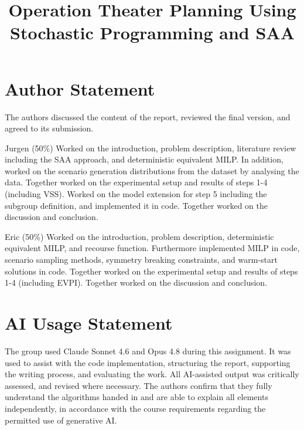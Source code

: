 \documentclass[conference]{IEEEtran}
\begin{document}
\title{Operation Theater Planning Using Stochastic Programming and SAA\\
}

\author{
\and
{}
}

\maketitle


















\section{Author Statement}
The authors discussed the content of the report, reviewed the final version, and agreed to its submission.

Jurgen (50\%) Worked on the introduction, problem description, literature review including the SAA approach, and deterministic equivalent MILP. In addition, worked on the scenario generation distributions from the dataset by analysing the data. Together worked on the experimental setup and results of steps 1-4 (including VSS). Worked on the model extension for step 5 including the subgroup definition, and implemented it in code. Together worked on the discussion and conclusion.

Eric (50\%) Worked on the introduction, problem description, deterministic equivalent MILP, and recourse function. Furthermore implemented MILP in code, scenario sampling methods, symmetry breaking constraints, and warm-start solutions in code. Together worked on the experimental setup and results of steps 1-4 (including EVPI). Together worked on the discussion and conclusion.

\section{AI Usage Statement}
The group used Claude Sonnet 4.6 and Opus 4.8 during this assignment. It was used to assist with the code implementation, structuring the report, supporting the writing process, and evaluating the work. All AI-assisted output was critically assessed, and revised where necessary. The authors confirm that they fully understand the algorithms handed in and are able to explain all elements independently, in accordance with the course requirements regarding the permitted use of generative AI.





\end{document}
